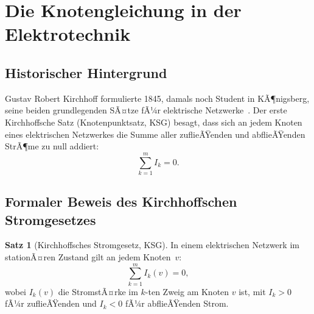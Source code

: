 ﻿\documentclass[a4paper,12pt]{article}
\theoremstyle{definition}
\newtheorem{satz}{Satz}
\begin{document}
\section{Die Knotengleichung in der Elektrotechnik}

\subsection{Historischer Hintergrund}

Gustav Robert Kirchhoff formulierte 1845, damals noch Student in KÃ¶nigsberg,
seine beiden grundlegenden SÃ¤tze fÃ¼r elektrische Netzwerke~\cite{kirchhoff1845}.
Der erste Kirchhoffsche Satz (Knotenpunktsatz, KSG) besagt, dass sich an
jedem Knoten eines elektrischen Netzwerkes die Summe aller zuflieÃŸenden
und abflieÃŸenden StrÃ¶me zu null addiert:
\[
  \sum_{k=1}^{m} I_k = 0.
\]

\subsection{Formaler Beweis des Kirchhoffschen Stromgesetzes}

\begin{satz}[Kirchhoffsches Stromgesetz, KSG]
  \label{satz:ksg}
  In einem elektrischen Netzwerk im stationÃ¤ren Zustand gilt an jedem
  Knoten~$v$:
  \[
    \sum_{k=1}^{m} I_k(v) = 0,
  \]
  wobei $I_k(v)$ die StromstÃ¤rke im $k$-ten Zweig am Knoten $v$ ist,
  mit $I_k > 0$ fÃ¼r zuflieÃŸenden und $I_k < 0$ fÃ¼r abflieÃŸenden Strom.
\end{satz}
\end{document}
